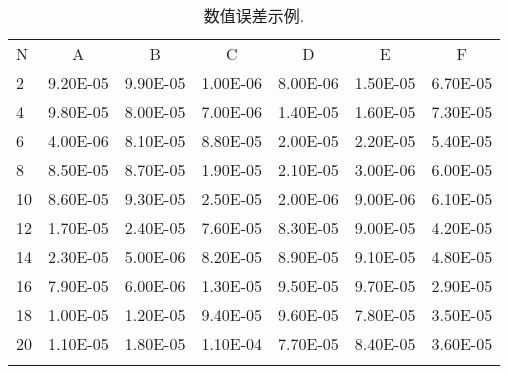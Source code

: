 \documentclass[master]{shnuthesis}
\begin{document}
\begin{table}[htp!]
\centering
\renewcommand\arraystretch{1.2} %
\caption{数值误差示例.}
\label{tab:error2}
\begin{tabularx}{0.96\textwidth}{||P{0.8cm}|C|C|C|C|C|C||}
\Xhline{2\arrayrulewidth}
N  & A       & B    & C       & D      & E       & F   \\
\Xhline{2\arrayrulewidth}
2  & 9.20E-05 & 9.90E-05 & 1.00E-06 & 8.00E-06 & 1.50E-05 & 6.70E-05 \\
4  & 9.80E-05 & 8.00E-05 & 7.00E-06 & 1.40E-05 & 1.60E-05 & 7.30E-05 \\
6  & 4.00E-06 & 8.10E-05 & 8.80E-05 & 2.00E-05 & 2.20E-05 & 5.40E-05 \\
8  & 8.50E-05 & 8.70E-05 & 1.90E-05 & 2.10E-05 & 3.00E-06 & 6.00E-05 \\
10 & 8.60E-05 & 9.30E-05 & 2.50E-05 & 2.00E-06 & 9.00E-06 & 6.10E-05 \\
12 & 1.70E-05 & 2.40E-05 & 7.60E-05 & 8.30E-05 & 9.00E-05 & 4.20E-05 \\
14 & 2.30E-05 & 5.00E-06 & 8.20E-05 & 8.90E-05 & 9.10E-05 & 4.80E-05 \\
16 & 7.90E-05 & 6.00E-06 & 1.30E-05 & 9.50E-05 & 9.70E-05 & 2.90E-05 \\
18 & 1.00E-05 & 1.20E-05 & 9.40E-05 & 9.60E-05 & 7.80E-05 & 3.50E-05 \\
20 & 1.10E-05 & 1.80E-05 & 1.10E-04   & 7.70E-05 & 8.40E-05 & 3.60E-05  \\
\Xhline{2\arrayrulewidth}
\end{tabularx}
\end{table}





\backmatter  %





%




\end{document}
